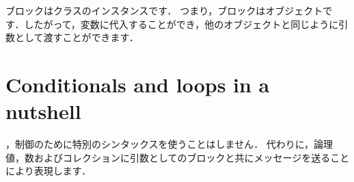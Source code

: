 \documentclass[a4paper,10pt,twoside]{book}
\begin{document}
ブロックはクラスのインスタンスです．
つまり，ブロックはオブジェクトです．したがって，変数に代入することができ，他のオブジェクトと同じように引数として渡すことができます．







\section{Conditionals and loops in a nutshell}

，制御のために特別のシンタックスを使うことはしません．
代わりに，論理値，数およびコレクションに引数としてのブロックと共にメッセージを送ることにより表現します．
\end{document}
